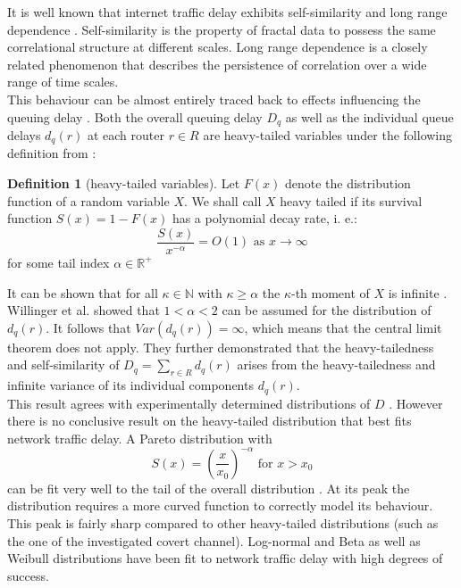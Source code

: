 \documentclass[12pt,a4paper,automark, toc=bib]{scrreprt}
\theoremstyle{definition}
\newtheorem{definition}{Definition}[chapter]
\begin{document}
			It is well known that internet traffic delay exhibits self-similarity  \cite{Crovella1997} and long range dependence  \cite{Kocisky2008}. Self-similarity is the property of fractal data to possess the same correlational structure at different scales. Long range dependence is a closely related phenomenon that describes the persistence of correlation over a wide range of time scales. \\
			This behaviour can be almost entirely traced back to effects influencing the queuing delay  \cite{Willinger1997}. Both the overall queuing delay $D_q$  \cite{Bovy} as well as the individual queue delays $d_q(r)$ at each router $r \in R$  \cite{Popescu2008} are heavy-tailed variables under the following definition from  \citeauthor{Cooke2011}  \cite{Cooke2011}: 
			\begin{definition}[heavy-tailed variables]
				Let $F(x)$ denote the distribution function of a random variable $X$. We shall call $X$ heavy tailed if its survival function $S(x) = 1 - F(x)$ has a polynomial decay rate, i. e.: 
				\begin{equation} \frac{S(x)}{x^{-\alpha}} = O(1)\text{ as } x \rightarrow \infty
				\end{equation}
				for some tail index $\alpha \in \mathbb{R}^+$
			\end{definition}
			It can be shown that for all $\kappa \in \mathbb{N}$ with $\kappa \geq \alpha$ the $\kappa$-th moment of $X$ is infinite  \cite{Cooke2011}. Willinger et al.  \cite{Willinger1997} showed that $1 < \alpha < 2$ can be assumed for the distribution of $d_q(r)$. It follows that $Var(d_q(r)) = \infty$, which means that the central limit theorem does not apply. They further demonstrated that the heavy-tailedness and self-similarity of  $D_q = \sum_{r \in R} d_q(r)$ arises from the heavy-tailedness and infinite variance of its individual components $d_q(r)$.\\
			This result agrees with experimentally determined distributions of $D$ 
			 \cite{Fremond2021, Pfitzinger2018a, Pfitzinger2018, Papagiannaki2003}. However there is no conclusive result on the heavy-tailed distribution that best fits network traffic delay. A Pareto distribution with 
			\begin{equation}
				\label{pareto}
				S(x) = {\left( \frac{x}{x_0} \right) }^{-\alpha} 
				\text{ for } x > x_0
			\end{equation} 
			 can be fit very well to the tail of the overall distribution  \cite{Pfitzinger2018a, Fremond2021}. At its peak the distribution requires a more curved function to correctly model its behaviour. This peak is fairly sharp compared to other heavy-tailed distributions (such as the one of the investigated covert channel). Log-normal and Beta  \cite{Pfitzinger2018a} as well as Weibull  \cite{Papagiannaki2003} distributions have been fit to network traffic delay with high degrees of success.\\
\end{document}
